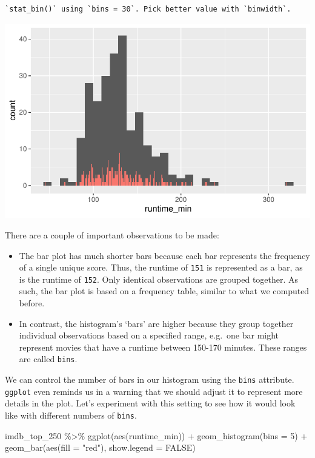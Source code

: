 \documentclass[
  letterpaper,
]{krantz}
\makeatletter
\newenvironment{Shaded}{\begin{snugshade}}{\end{snugshade}}
\newcommand{\AttributeTok}[1]{\textcolor[rgb]{0.40,0.45,0.13}{#1}}
\newcommand{\ConstantTok}[1]{\textcolor[rgb]{0.56,0.35,0.01}{#1}}
\newcommand{\DecValTok}[1]{\textcolor[rgb]{0.68,0.00,0.00}{#1}}
\newcommand{\FunctionTok}[1]{\textcolor[rgb]{0.28,0.35,0.67}{#1}}
\newcommand{\NormalTok}[1]{\textcolor[rgb]{0.00,0.23,0.31}{#1}}
\newcommand{\SpecialCharTok}[1]{\textcolor[rgb]{0.37,0.37,0.37}{#1}}
\newcommand{\StringTok}[1]{\textcolor[rgb]{0.13,0.47,0.30}{#1}}
\newenvironment{kframe}{%
\medskip{}
\setlength{\fboxsep}{.8em}
 \def\at@end@of@kframe{}%
 \ifinner\ifhmode%
  \def\at@end@of@kframe{\end{minipage}}%
  \begin{minipage}{\columnwidth}%
 \fi\fi%
 \def\FrameCommand##1{\hskip\@totalleftmargin \hskip-\fboxsep
 \colorbox{shadecolor}{##1}\hskip-\fboxsep
     \hskip-\linewidth \hskip-\@totalleftmargin \hskip\columnwidth}%
 \MakeFramed {\advance\hsize-\width
   \@totalleftmargin\z@ \linewidth\hsize
   \@setminipage}}%
 {\par\unskip\endMakeFramed%
 \at@end@of@kframe}
\renewenvironment{Shaded}{\begin{kframe}}{\end{kframe}}
\makeatother
\begin{document}
\begin{verbatim}
`stat_bin()` using `bins = 30`. Pick better value with `binwidth`.
\end{verbatim}

\includegraphics{08_descriptive_statistics_files/figure-pdf/histogram-vs-barplot-1.pdf}

There are a couple of important observations to be made:

\begin{itemize}
\item
  The bar plot has much shorter bars because each bar represents the
  frequency of a single unique score. Thus, the runtime of \texttt{151}
  is represented as a bar, as is the runtime of \texttt{152}. Only
  identical observations are grouped together. As such, the bar plot is
  based on a frequency table, similar to what we computed before.
\item
  In contrast, the histogram's `bars' are higher because they group
  together individual observations based on a specified range, e.g.~one
  bar might represent movies that have a runtime between 150-170
  minutes. These ranges are called \texttt{bins}.
\end{itemize}

We can control the number of bars in our histogram using the
\texttt{bins} attribute. \texttt{ggplot} even reminds us in a warning
that we should adjust it to represent more details in the plot. Let's
experiment with this setting to see how it would look like with
different numbers of \texttt{bins}.

\begin{Shaded}
\begin{Highlighting}[]
\NormalTok{imdb\_top\_250 }\SpecialCharTok{\%\textgreater{}\%}
  \FunctionTok{ggplot}\NormalTok{(}\FunctionTok{aes}\NormalTok{(runtime\_min)) }\SpecialCharTok{+}
  \FunctionTok{geom\_histogram}\NormalTok{(}\AttributeTok{bins =} \DecValTok{5}\NormalTok{) }\SpecialCharTok{+}
  \FunctionTok{geom\_bar}\NormalTok{(}\FunctionTok{aes}\NormalTok{(}\AttributeTok{fill =} \StringTok{"red"}\NormalTok{), }\AttributeTok{show.legend =} \ConstantTok{FALSE}\NormalTok{)}
\end{Highlighting}
\end{Shaded}
\end{document}
